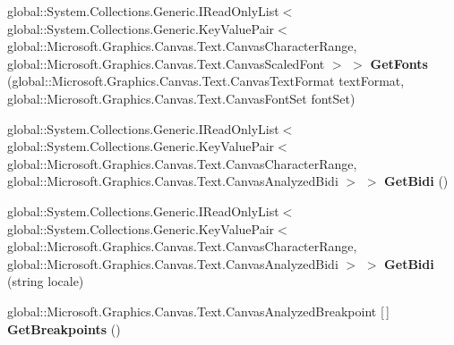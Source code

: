 \begin{DoxyCompactItemize}
\item 
\mbox{\label{class_microsoft_1_1_graphics_1_1_canvas_1_1_text_1_1_canvas_text_analyzer_a9391eb6d25fdcd24794b19ace3079abb}} 
global\+::\+System.\+Collections.\+Generic.\+I\+Read\+Only\+List$<$ global\+::\+System.\+Collections.\+Generic.\+Key\+Value\+Pair$<$ global\+::\+Microsoft.\+Graphics.\+Canvas.\+Text.\+Canvas\+Character\+Range, global\+::\+Microsoft.\+Graphics.\+Canvas.\+Text.\+Canvas\+Scaled\+Font $>$ $>$ {\bfseries Get\+Fonts} (global\+::\+Microsoft.\+Graphics.\+Canvas.\+Text.\+Canvas\+Text\+Format text\+Format, global\+::\+Microsoft.\+Graphics.\+Canvas.\+Text.\+Canvas\+Font\+Set font\+Set)
\item 
\mbox{\label{class_microsoft_1_1_graphics_1_1_canvas_1_1_text_1_1_canvas_text_analyzer_a126fa8fa30a35ccb5f02bfc0b7f3555a}} 
global\+::\+System.\+Collections.\+Generic.\+I\+Read\+Only\+List$<$ global\+::\+System.\+Collections.\+Generic.\+Key\+Value\+Pair$<$ global\+::\+Microsoft.\+Graphics.\+Canvas.\+Text.\+Canvas\+Character\+Range, global\+::\+Microsoft.\+Graphics.\+Canvas.\+Text.\+Canvas\+Analyzed\+Bidi $>$ $>$ {\bfseries Get\+Bidi} ()
\item 
\mbox{\label{class_microsoft_1_1_graphics_1_1_canvas_1_1_text_1_1_canvas_text_analyzer_a2e6d9177ebbc245e8b654995526c08c6}} 
global\+::\+System.\+Collections.\+Generic.\+I\+Read\+Only\+List$<$ global\+::\+System.\+Collections.\+Generic.\+Key\+Value\+Pair$<$ global\+::\+Microsoft.\+Graphics.\+Canvas.\+Text.\+Canvas\+Character\+Range, global\+::\+Microsoft.\+Graphics.\+Canvas.\+Text.\+Canvas\+Analyzed\+Bidi $>$ $>$ {\bfseries Get\+Bidi} (string locale)
\item 
\mbox{\label{class_microsoft_1_1_graphics_1_1_canvas_1_1_text_1_1_canvas_text_analyzer_a8c6c6adb235f7f370a7d2cd4be812e59}} 
global\+::\+Microsoft.\+Graphics.\+Canvas.\+Text.\+Canvas\+Analyzed\+Breakpoint \mbox{[}$\,$\mbox{]} {\bfseries Get\+Breakpoints} ()
\item 
\mbox{\label{class_microsoft_1_1_graphics_1_1_canvas_1_1_text_1_1_canvas_text_analyzer_a7f12634faf61280080d6775ca31df5f7}} 

\end{DoxyCompactItemize}
